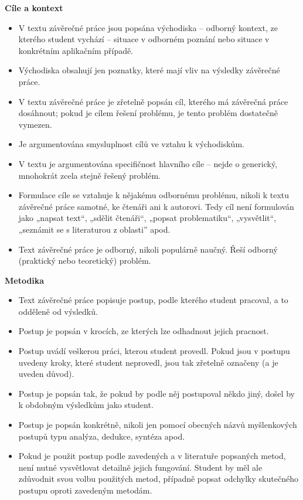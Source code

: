 {\bfseries\sffamily\Large Cíle a kontext}
\begin{itemize}
\item \vspace*{-2ex}V textu závěrečné práce jsou popsána východiska – odborný kontext, ze kterého student vychází – situace v odborném poznání nebo situace v konkrétním aplikačním případě.
\item Východiska obsahují jen poznatky, které mají vliv na výsledky závěrečné práce.
\item V textu závěrečné práce je zřetelně popsán cíl, kterého má závěrečná práce dosáhnout; pokud je cílem řešení problému, je tento problém dostatečně vymezen.
\item Je argumentována smysluplnost cílů ve vztahu k východiskům.
\item V textu je argumentována specifičnost hlavního cíle – nejde o generický, mnohokrát zcela stejně řešený problém.
\item Formulace cíle se vztahuje k nějakému odbornému problému, nikoli k textu závěrečné práce samotné, ke čtenáři ani k autorovi. Tedy cíl není formulován jako „napsat text“, „sdělit čtenáři“, „popsat problematiku“, „vysvětlit“, „seznámit se s literaturou z oblasti” apod.
\item Text závěrečné práce je odborný, nikoli populárně naučný. Řeší odborný (praktický nebo teoretický) problém.
\end{itemize}

{\bfseries\sffamily\Large Metodika}
\begin{itemize}
\item \vspace*{-2ex}Text závěrečné práce popisuje postup, podle kterého student pracoval, a to odděleně od výsledků.
\item Postup je popsán v krocích, ze kterých lze odhadnout jejich pracnost.
\item Postup uvádí veškerou práci, kterou student provedl. Pokud jsou v postupu uvedeny kroky, které student neprovedl, jsou tak zřetelně označeny (a je uveden důvod).
\item Postup je popsán tak, že pokud by podle něj postupoval někdo jiný, došel by k obdobným výsledkům jako student.
\item Postup je popsán konkrétně, nikoli jen pomocí obecných názvů myšlenkových postupů typu analýza, dedukce, syntéza apod.
\item Pokud je použit postup podle zavedených a v literatuře popsaných metod, není nutné vysvětlovat detailně jejich fungování. Student by měl ale zdůvodnit svou volbu použitých metod, případně popsat odchylky skutečného postupu oproti zavedeným metodám.
\end{itemize}

